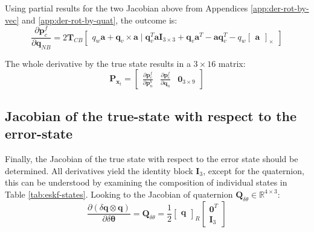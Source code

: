 Using partial results for the two Jacobian above from Appendices \ref{app:der-rot-by-vec} and \ref{app:der-rot-by-quat}, the outcome is:
\begin{equation}
    \frac{\partial\mathbf{p}_c^f}{\partial\mathbf{q}_{NB}}=2\mathbf{T}_{CB}\begin{bmatrix}
        q_w\mathbf{a}+\mathbf{q}_v\times\mathbf{a}\; | \;\mathbf{q}_v^T\mathbf{a}\mathbf{I}_{3\times 3}+\mathbf{q}_v\mathbf{a}^T-\mathbf{a}\mathbf{q}_v^T-q_w\begin{bmatrix}
            \mathbf{a}
        \end{bmatrix}_\times
    \end{bmatrix}
\end{equation}

The whole derivative by the true state results in a $3\times 16$ matrix:
\begin{equation}
    \mathbf{P}_{\mathbf{x}_t}=\begin{bmatrix}
     \frac{\partial\mathbf{p}_c^f}{\partial\mathbf{p}_n^b} & \frac{\partial\mathbf{p}_c^f}{\partial\mathbf{q}_n} & \mathbf{0}_{3\times 9}
    \end{bmatrix}
\end{equation}

\subsection*{Jacobian of the true-state with respect to the error-state}

Finally, the Jacobian of the true state with respect to the error state should be determined. All derivatives yield the identity block $\mathbf{I}_3$, except for the quaternion, this can be understood by examining the composition of individual states in Table \ref{tab:eskf-states}. Looking to the Jacobian of quaternion $\mathbf{Q}_{\delta\theta}\in\mathbb{R}^{4\times 3}$:
\begin{equation}
    \frac{\partial(\delta\mathbf{q}\otimes \mathbf{q})}{\partial\delta\boldsymbol{\theta}} = \mathbf{Q}_{\delta\theta} = \frac{1}{2}\begin{bmatrix}
        \mathbf{q}
    \end{bmatrix}_R
    \begin{bmatrix}
        \mathbf{0}^T \\
        \mathbf{I}_3
    \end{bmatrix} 
\end{equation}

